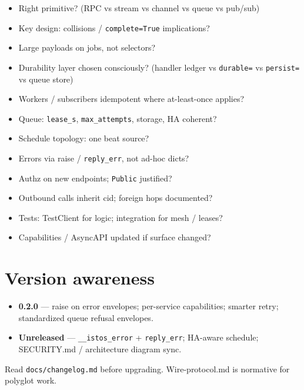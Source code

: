 \documentclass[11pt,a4paper]{article}
\begin{document}
\begin{itemize}[leftmargin=*]
  \item[$\square$] Right primitive? (RPC vs stream vs channel vs queue vs pub/sub)
  \item[$\square$] Key design: collisions / \texttt{complete=True} implications?
  \item[$\square$] Large payloads on jobs, not selectors?
  \item[$\square$] Durability layer chosen consciously?
        (handler ledger vs \texttt{durable=} vs \texttt{persist=} vs queue store)
  \item[$\square$] Workers / subscribers idempotent where at-least-once applies?
  \item[$\square$] Queue: \texttt{lease\_s}, \texttt{max\_attempts}, storage, HA coherent?
  \item[$\square$] Schedule topology: one beat source?
  \item[$\square$] Errors via raise / \texttt{reply\_err}, not ad-hoc dicts?
  \item[$\square$] Authz on new endpoints; \texttt{Public} justified?
  \item[$\square$] Outbound calls inherit cid; foreign hops documented?
  \item[$\square$] Tests: TestClient for logic; integration for mesh / leases?
  \item[$\square$] Capabilities / AsyncAPI updated if surface changed?
\end{itemize}

\section{Version awareness}

\begin{itemize}[leftmargin=*]
  \item \textbf{0.2.0} --- raise on error envelopes; per-service capabilities;
        smarter retry; standardized queue refusal envelopes.
  \item \textbf{Unreleased} --- \texttt{\_\_istos\_error} + \texttt{reply\_err};
        HA-aware schedule; SECURITY.md / architecture diagram sync.
\end{itemize}

Read \texttt{docs/changelog.md} before upgrading. Wire-protocol.md is normative
for polyglot work.
\end{document}

